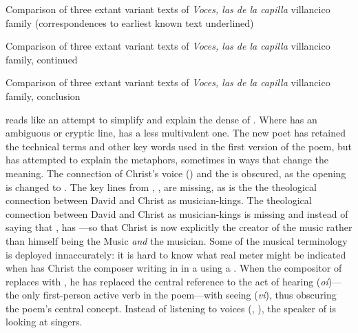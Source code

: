 {Comparison of three extant variant texts of \emph{Voces, las de la capilla}
villancico family (correspondences to earliest known text underlined)}

{Comparison of three extant variant texts of \emph{Voces, las de la capilla}
villancico family, continued}

{Comparison of three extant variant texts of \emph{Voces, las de la capilla}
villancico family, conclusion}

 reads like an attempt to simplify and explain the dense
 of .
Where  has an ambiguous or cryptic line,  has a
less multivalent one. 
The new poet has retained the technical terms and other key words used in the
first version of the poem, but has attempted to explain the metaphors, sometimes
in ways that change the meaning.
The connection of Christ's voice () and the  is obscured, as the opening is changed to .
The key lines from , , are missing, as is the the theological connection between
David and Christ as musician-kings.
The theological connection between David and Christ as musician-kings is
missing and instead of saying that ,
 has ---so that Christ is now
explicitly the creator of the music rather than himself being the Music
\emph{and} the musician.
Some of the musical terminology is deployed innaccurately: it is hard to know
what real meter might be indicated when  has Christ the
composer writing in  in a 
using a .
When the compositor of  replaces  with , he has replaced the central
reference to the act of hearing (\emph{oí})---the only first-person active verb
in the poem---with seeing (\emph{vi}), thus obscuring the poem's central
concept. 
Instead of listening to voices (, ), the speaker of
 is looking at singers.

